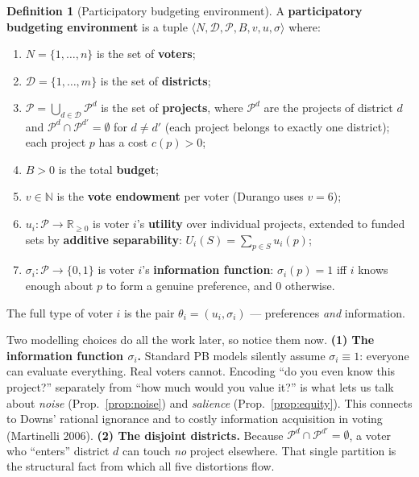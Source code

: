 \documentclass[11pt,letterpaper]{article}
\theoremstyle{definition}
\newtheorem{definition}{Definition}[section]
\theoremstyle{plain}
\theoremstyle{remark}
\newcommand{\R}{\mathbb{R}}
\newcommand{\D}{\mathcal{D}}
\newcommand{\Pset}{\mathcal{P}}
\newcommand{\agents}{N}
\newcommand{\votes}{v}
\newcommand{\budget}{B}
\newcommand{\cost}{c}
\newcommand{\type}{\theta}
\begin{document}
\begin{definition}[Participatory budgeting environment]
\label{def:pb}
A \textbf{participatory budgeting environment} is a tuple
$\langle\agents,\D,\Pset,\budget,\votes,u,\sigma\rangle$ where:
\begin{enumerate}[label=(\roman*),nosep]
  \item $\agents=\{1,\dots,n\}$ is the set of \textbf{voters};
  \item $\D=\{1,\dots,m\}$ is the set of \textbf{districts};
  \item $\Pset=\bigcup_{d\in\D}\Pset^d$ is the set of \textbf{projects}, where $\Pset^d$ are the
        projects of district $d$ and $\Pset^d\cap\Pset^{d'}=\emptyset$ for $d\ne d'$ (each project
        belongs to exactly one district); each project $p$ has a cost $\cost(p)>0$;
  \item $\budget>0$ is the total \textbf{budget};
  \item $\votes\in\mathbb{N}$ is the \textbf{vote endowment} per voter (Durango uses $\votes=6$);
  \item $u_i:\Pset\to\R_{\ge0}$ is voter $i$'s \textbf{utility} over individual projects, extended
        to funded sets by \textbf{additive separability}: $U_i(S)=\sum_{p\in S}u_i(p)$;
  \item $\sigma_i:\Pset\to\{0,1\}$ is voter $i$'s \textbf{information function}: $\sigma_i(p)=1$
        iff $i$ knows enough about $p$ to form a genuine preference, and $0$ otherwise.
\end{enumerate}
The full type of voter $i$ is the pair $\type_i=(u_i,\sigma_i)$ --- preferences \emph{and} information.
\end{definition}

\begin{keyidea}
Two modelling choices do all the work later, so notice them now.
\textbf{(1) The information function $\sigma_i$.} Standard PB models silently assume
$\sigma_i\equiv1$: everyone can evaluate everything. Real voters cannot. Encoding ``do you even
know this project?'' separately from ``how much would you value it?'' is what lets us talk about
\emph{noise} (Prop.~\ref{prop:noise}) and \emph{salience} (Prop.~\ref{prop:equity}). This connects
to Downs' rational ignorance and to costly information acquisition in voting (Martinelli 2006).
\textbf{(2) The disjoint districts.} Because $\Pset^d\cap\Pset^{d'}=\emptyset$, a voter who
``enters'' district $d$ can touch \emph{no} project elsewhere. That single partition is the
structural fact from which all five distortions flow.
\end{keyidea}
\end{document}
